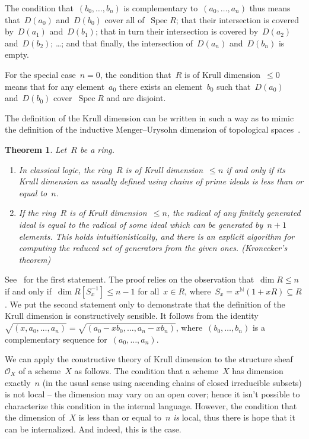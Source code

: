 \documentclass[10pt,reqno,a4paper]{amsbook}
\makeatletter
\theoremstyle{definition}
\theoremstyle{plain}
\newtheorem{thm}[defn]{Theorem}
\theoremstyle{remark}
\renewcommand{\O}{\mathcal{O}}
\newcommand{\NN}{\mathbb{N}}
\DeclareMathOperator{\Spec}{Spec}
\newcommand{\?}{\,{:}\,}
\renewcommand{\_}{\mathpunct{.}\,}
\renewenvironment{proof}[1][\proofname]{\par
  \pushQED{\qed}%
  \normalfont \topsep6\p@\@plus6\p@\relax
  \trivlist
  \item[\hskip\labelsep
        \itshape
    #1\@addpunct{.}]\ignorespaces
}{%
  \popQED\endtrivlist\@endpefalse
}
\makeatother
\begin{document}
The condition that~$(b_0,\ldots,b_n)$ is complementary to~$(a_0,\ldots,a_n)$
thus means that~$D(a_0)$ and~$D(b_0)$ cover all of~$\Spec R$; that their
intersection is covered by~$D(a_1)$ and~$D(b_1)$; that in turn their
intersection is covered by~$D(a_2)$ and~$D(b_2)$; \ldots; and that finally, the
intersection of~$D(a_n)$ and~$D(b_n)$ is empty.

For the special case~$n = 0$, the condition that~$R$ is of Krull
dimension~$\leq 0$ means that for any element~$a_0$ there exists an
element~$b_0$ such that~$D(a_0)$ and~$D(b_0)$ cover~$\Spec R$ and are disjoint.

The definition of the Krull dimension can be written in such a way as to mimic the
definition of the inductive Menger--Urysohn dimension of topological
spaces~\cite[Section~1]{dyn:krull-integral}.

\begin{thm}Let~$R$ be a ring.
\begin{enumerate}
\item In classical logic, the ring~$R$ is
of Krull dimension~$\leq n$ if and only if its Krull dimension
as usually defined using chains of prime ideals is less than or equal to~$n$.
\item If the ring~$R$ is
of Krull dimension~$\leq n$, the radical of any finitely generated ideal is
equal to the radical of some ideal which can be generated by~$n+1$ elements.
This holds intuitionistically, and there is an explicit algorithm for computing
the reduced set of generators from the given ones. (Kronecker's theorem)
\end{enumerate}
\end{thm}
\begin{proof}See~\cite[Theorem~1.2]{dyn:krull-integral} for the first
statement. The proof relies on the observation that~$\dim R \leq n$ if and only
if~$\dim R[S_x^{-1}] \leq n-1$ for all~$x \in R$, where~$S_x = x^\NN (1+xR)
\subseteq R$. We put the second statement only to demonstrate that the
definition of the Krull dimension is constructively sensible. It follows from
the identity~$\sqrt{(x,a_0,\ldots,a_n)} =
\sqrt{(a_0-xb_0,\ldots,a_n-xb_n)}$, where~$(b_0,\ldots,b_n)$ is a complementary
sequence for~$(a_0,\ldots,a_n)$.
\end{proof}

We can apply the constructive theory of Krull dimension to the structure
sheaf~$\O_X$ of a scheme~$X$ as follows. The condition that a
scheme~$X$ has dimension exactly~$n$ (in the usual sense using ascending chains
of closed irreducible subsets) is not local -- the dimension may vary on
an open cover; hence it isn't possible to characterize this condition in
the internal language. However, the condition that the dimension of~$X$ is less
than or equal to~$n$ \emph{is} local, thus there is hope that it can be
internalized. And indeed, this is the case.
\end{document}
